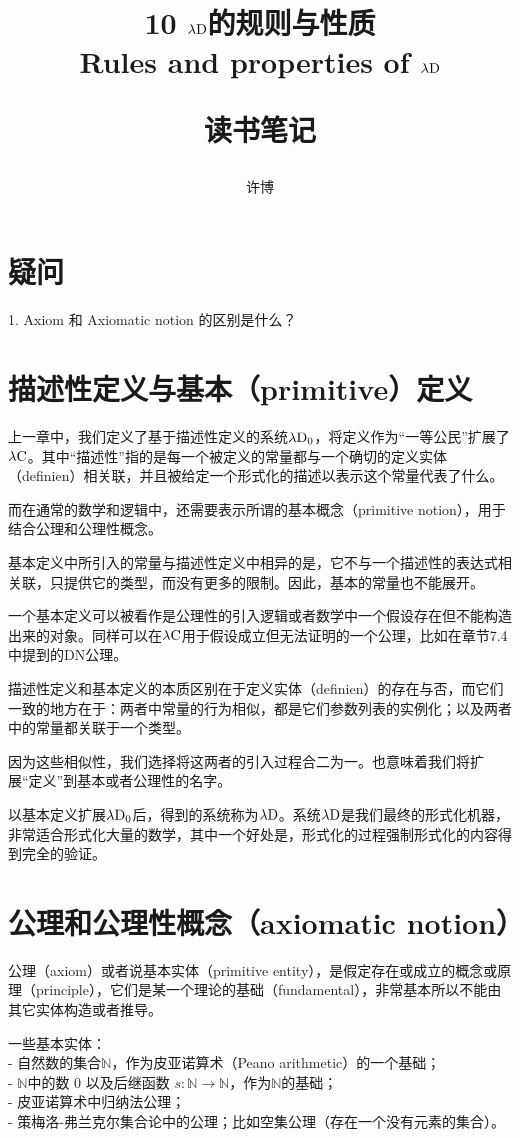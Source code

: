 \documentclass[UTF8]{article}
\title{10 $\lambda{\rm D}$的规则与性质\\Rules and properties of $\lambda{\rm D}$\\[2ex]\begin{large}读书笔记\end{large}}
\author{许博}
\date{}
\begin{document}
\maketitle
	\section{疑问}
	
		1. Axiom 和 Axiomatic notion 的区别是什么？

	\section{描述性定义与基本（primitive）定义}
	\noindent
	上一章中，我们定义了基于描述性定义的系统$\lambda{\rm D_0}$，将定义作为“一等公民”扩展了$\lambda{\rm C}$。其中“描述性”指的是每一个被定义的常量都与一个确切的定义实体（definien）相关联，并且被给定一个形式化的描述以表示这个常量代表了什么。
	
		而在通常的数学和逻辑中，还需要表示所谓的基本概念（primitive  notion），用于结合公理和公理性概念。
		
		基本定义中所引入的常量与描述性定义中相异的是，它不与一个描述性的表达式相关联，只提供它的类型，而没有更多的限制。因此，基本的常量也不能展开。
		
		一个基本定义可以被看作是公理性的引入逻辑或者数学中一个假设存在但不能构造出来的对象。同样可以在$\lambda{\rm C}$用于假设成立但无法证明的一个公理，比如在章节7.4中提到的DN公理。
		
		描述性定义和基本定义的本质区别在于定义实体（definien）的存在与否，而它们一致的地方在于：两者中常量的行为相似，都是它们参数列表的实例化；以及两者中的常量都关联于一个类型。
		
		因为这些相似性，我们选择将这两者的引入过程合二为一。也意味着我们将扩展“定义”到基本或者公理性的名字。
		
		以基本定义扩展$\lambda{\rm D_0}$后，得到的系统称为$\lambda{\rm D}$。系统$\lambda{\rm D}$是我们最终的形式化机器，非常适合形式化大量的数学，其中一个好处是，形式化的过程强制形式化的内容得到完全的验证。
		
	\section{公理和公理性概念（axiomatic notion）}
	\noindent
	公理（axiom）或者说基本实体（primitive  entity），是假定存在或成立的概念或原理（principle），它们是某一个理论的基础（fundamental），非常基本所以不能由其它实体构造或者推导。
	
		一些基本实体：\\
		- 自然数的集合$\mathbb{N}$，作为皮亚诺算术（Peano arithmetic）的一个基础；\\
		- $\mathbb{N}$中的数 0 以及后继函数 $s:\mathbb{N}\rightarrow\mathbb{N}$，作为$\mathbb{N}$的基础；\\
		- 皮亚诺算术中归纳法公理；\\
		- 策梅洛-弗兰克尔集合论中的公理；比如空集公理（存在一个没有元素的集合）。
		
\end{document}
